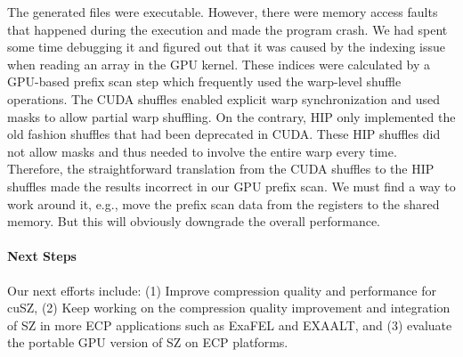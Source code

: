 The generated files were executable. However, there were memory access faults that happened during the execution and made the program crash. We had spent some time debugging it and figured out that it was caused by the indexing issue when reading an array in the GPU kernel. These indices were calculated by a GPU-based prefix scan step which frequently used the warp-level shuffle operations. The CUDA shuffles enabled explicit warp synchronization and used masks to allow partial warp shuffling. On the contrary, HIP only implemented the old fashion shuffles that had been deprecated in CUDA. These HIP shuffles did not allow masks and thus needed to involve the entire warp every time. Therefore, the straightforward translation from the CUDA shuffles to the HIP shuffles made the results incorrect in our GPU prefix scan. We must find a way to work around it, e.g., move the prefix scan data from the registers to the shared memory. But this will obviously downgrade the overall performance.


\paragraph{Next Steps} Our next efforts include: (1) Improve compression quality and performance for cuSZ, (2) Keep working on the compression quality improvement and integration of SZ in more ECP applications such as ExaFEL and EXAALT, and (3) evaluate the portable GPU version of SZ on ECP platforms.

